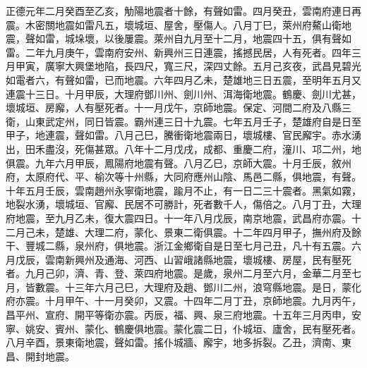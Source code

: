 \begin{pinyinscope}
正德元年二月癸酉至乙亥，觔陽地震者十餘，有聲如雷。四月癸丑，雲南府連日再震。木密關地震如雷凡五，壞城垣、屋舍，壓傷人。八月丁巳，萊州府鰲山衛地震，聲如雷，城垛壞，以後屢震。萊州自九月至十二月，地震四十五，俱有聲如雷。二年九月庚午，雲南府安州、新興州三日連震，搖撼民居，人有死者。四年三月甲寅，廣寧大興堡地陷，長四尺，寬三尺，深四丈餘。五月己亥夜，武昌見碧光如電者六，有聲如雷，已而地震。六年四月乙未，楚雄地三日五震，至明年五月又連震十三日。十月甲辰，大理府鄧川州、劍川州、洱海衛地震。鶴慶、劍川尤甚，壞城垣、房廨，人有壓死者。十一月戊午，京師地震。保定、河間二府及八縣三衛，山東武定州，同日皆震。霸州連三日十九震。七年五月壬子，楚雄府自是日至甲子，地連震，聲如雷。八月己巳，騰衝衛地震兩日，壞城樓、官民廨宇。赤水湧出，田禾盡沒，死傷甚眾。八年十二月戊戌，成都、重慶二府，潼川、邛二州，地俱震。九年六月甲辰，鳳陽府地震有聲。八月乙巳，京師大震。十月壬辰，敘州府，太原府代、平、榆次等十州縣，大同府應州山陰、馬邑二縣，俱地震，有聲。十年五月壬辰，雲南趙州永寧衛地震，踰月不止，有一日二三十震者。黑氣如霧，地裂水湧，壞城垣、官廨、民居不可勝計，死者數千人，傷倍之。八月丁丑，大理府地震，至九月乙未，復大震四日。十一年八月戊辰，南京地震，武昌府亦震。十二月己未，楚雄、大理二府，蒙化、景東二衛俱震。十二年四月甲子，撫州府及餘干、豐城二縣，泉州府，俱地震。浙江金鄉衛自是日至七月己丑，凡十有五震。六月戊辰，雲南新興州及通海、河西、山習峨諸縣地震，壞城樓、房屋，民有壓死者。九月己卯，濟、青、登、萊四府地震。是歲，泉州二月至六月，金華二月至七月，皆數震。十三年六月己巳，大理府及趙、鄧川二州，浪穹縣地震。是日，蒙化府亦震。十月甲午、十一月癸卯，又震。十四年二月丁丑，京師地震。九月丙午，昌平州、宣府、開平等衛亦震。丙辰，福、興、泉三府地震。十五年三月丙申，安寧、姚安、賓州、蒙化、鶴慶俱地震。蒙化震二日，仆城垣、廬舍，民有壓死者。八月辛酉，景東衛地震，聲如雷。搖仆城牆、廨宇，地多拆裂。乙丑，濟南、東昌、開封地震。


\end{pinyinscope}
